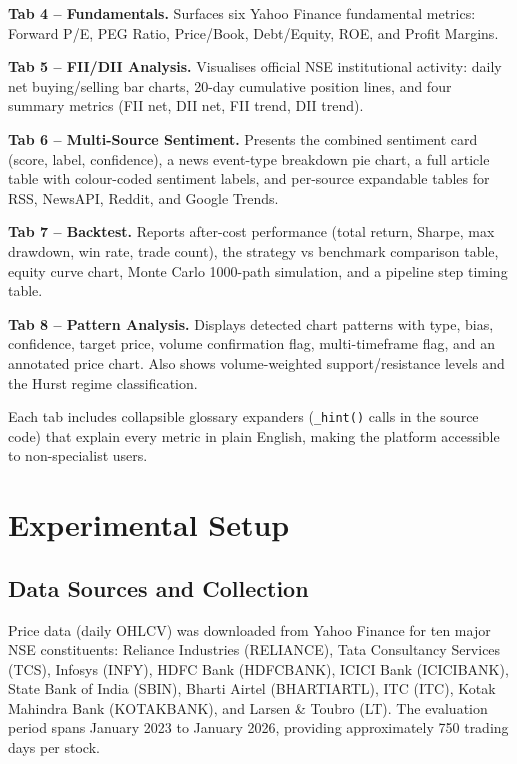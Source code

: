 \documentclass[10pt,a4paper,twoside]{article}
\begin{document}
\textbf{Tab 4 -- Fundamentals.} Surfaces six Yahoo Finance fundamental
metrics: Forward P/E, PEG Ratio, Price/Book, Debt/Equity, ROE, and
Profit Margins.

\textbf{Tab 5 -- FII/DII Analysis.} Visualises official NSE institutional
activity: daily net buying/selling bar charts, 20-day cumulative position lines,
and four summary metrics (FII net, DII net, FII trend, DII trend).

\textbf{Tab 6 -- Multi-Source Sentiment.} Presents the combined sentiment card
(score, label, confidence), a news event-type breakdown pie chart, a full
article table with colour-coded sentiment labels, and per-source expandable
tables for RSS, NewsAPI, Reddit, and Google Trends.

\textbf{Tab 7 -- Backtest.} Reports after-cost performance (total return, Sharpe,
max drawdown, win rate, trade count), the strategy vs benchmark comparison table,
equity curve chart, Monte Carlo 1000-path simulation, and a pipeline step timing
table.

\textbf{Tab 8 -- Pattern Analysis.} Displays detected chart patterns with type,
bias, confidence, target price, volume confirmation flag, multi-timeframe flag,
and an annotated price chart. Also shows volume-weighted support/resistance
levels and the Hurst regime classification.

Each tab includes collapsible glossary expanders (\texttt{\_hint()} calls in
the source code) that explain every metric in plain English, making the platform
accessible to non-specialist users.

\section{Experimental Setup}
\label{sec:setup}

\subsection{Data Sources and Collection}

Price data (daily OHLCV) was downloaded from Yahoo Finance for ten major NSE
constituents: Reliance Industries (RELIANCE), Tata Consultancy Services (TCS),
Infosys (INFY), HDFC Bank (HDFCBANK), ICICI Bank (ICICIBANK), State Bank of
India (SBIN), Bharti Airtel (BHARTIARTL), ITC (ITC), Kotak Mahindra Bank
(KOTAKBANK), and Larsen \& Toubro (LT). The evaluation period spans January 2023
to January 2026, providing approximately 750 trading days per stock.
\end{document}
